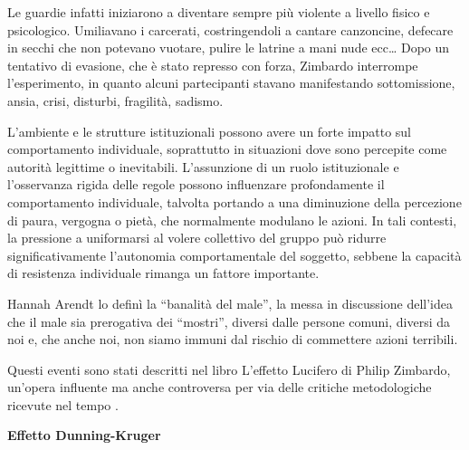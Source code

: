\documentclass[12pt]{book} %
\begin{document}
\begin{mdframed}[linewidth=1pt]
Le guardie infatti iniziarono a diventare sempre più violente a livello fisico e psicologico. Umiliavano i carcerati,
costringendoli a cantare canzoncine, defecare in secchi che non potevano vuotare, pulire le latrine a mani nude ecc…
Dopo un tentativo di evasione, che è stato represso con forza, Zimbardo interrompe l'esperimento,
in quanto alcuni partecipanti stavano manifestando sottomissione, ansia, crisi, disturbi, fragilità, sadismo.

L’ambiente e le strutture istituzionali possono avere un forte impatto sul comportamento individuale, soprattutto in situazioni dove sono percepite come autorità legittime o inevitabili.
L'assunzione di un ruolo istituzionale e l'osservanza rigida delle regole possono influenzare profondamente il comportamento individuale, talvolta portando a una diminuzione della percezione di paura, vergogna o pietà, che normalmente modulano le azioni. In tali contesti, la pressione a uniformarsi al volere collettivo del gruppo può ridurre significativamente l'autonomia comportamentale del soggetto, sebbene la capacità di resistenza individuale rimanga un fattore importante.

Hannah Arendt lo definì la “banalità del male”, la messa in discussione dell'idea che il male sia
prerogativa dei “mostri”, diversi dalle persone comuni, diversi da noi e, che anche noi, non siamo immuni dal rischio
di commettere azioni terribili.

Questi eventi sono stati descritti nel libro L'effetto Lucifero di Philip Zimbardo, un’opera influente ma anche controversa per via delle critiche metodologiche ricevute nel tempo .
\end{mdframed}

\needspace{4cm}
\noindent \textbf{\large Effetto Dunning-Kruger} \\
\end{document}
